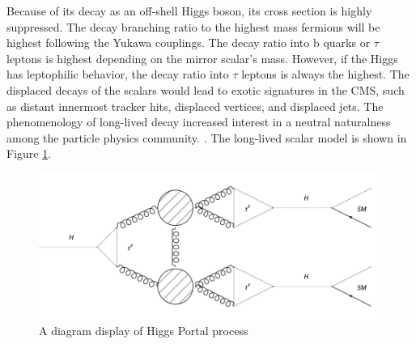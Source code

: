 Because of its decay as an off-shell Higgs boson, its cross section is highly suppressed.
The decay branching ratio to the highest mass fermions will be highest following the Yukawa couplings.
The decay ratio into b quarks or $\tau$ leptons is highest depending on the mirror scalar's mass.
However, if the Higgs has leptophilic behavior, the decay ratio into $\tau$ leptons is always the highest.
The displaced decays of the scalars would lead to exotic signatures in the CMS, such as distant innermost tracker hits, displaced vertices, and displaced jets.
The phenomenology of long-lived decay increased interest in a neutral naturalness among the particle physics community. \cite{Curtin:2015fna,Csaki:2015fba}.
The long-lived scalar model is shown in Figure \ref{fig:HiggsPortal}.



\begin{figure}[h!]
  \caption{A diagram display of Higgs Portal process}
  \label{fig:HiggsPortal}
  \centering
  \includegraphics[width=0.87\linewidth]{figs/TwinHiggs.png}
\end{figure}
